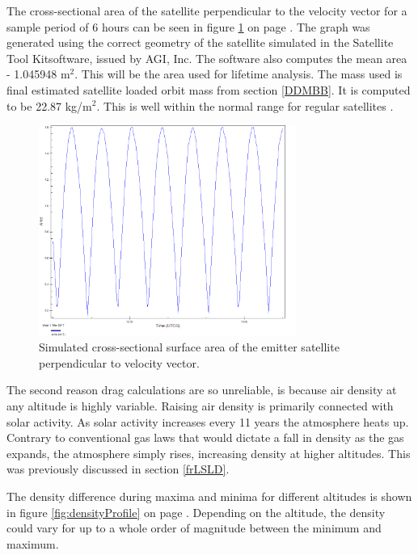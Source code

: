 The cross-sectional area of the satellite perpendicular to the velocity vector for a sample period of 6 hours can be seen in figure \ref{fig:area} on page \pageref{fig:area}. The graph was generated using the correct geometry of the satellite simulated in the Satellite Tool Kit\texttrademark software, issued by AGI, Inc. The software also computes the mean area - 1.045948 m$^2$. This will be the area used for lifetime analysis. The mass used is final estimated satellite loaded orbit mass from section \ref{DDMBB}. It is computed to be 22.87 kg/m$^2$. This is well within the normal range for regular satellites \cite{larson}.

\begin{figure}[ht!]
\centering
\includegraphics[width=0.75\textwidth, angle=0]{chapters/img/wetareaEmitter.png}
\caption{Simulated cross-sectional surface area of the emitter satellite perpendicular to velocity vector.}
\label{fig:area}
\end{figure}

The second reason drag calculations are so unreliable, is because air density at any altitude is highly variable. Raising air density is primarily connected with solar activity. As solar activity increases every 11 years the atmosphere heats up. Contrary to conventional gas laws that would dictate a fall in density as the gas expands, the atmosphere simply rises, increasing density at higher altitudes. This was previously discussed in section \ref{frLSLD}.

The density difference during maxima and minima for different altitudes is shown in figure \ref{fig:densityProfile} on page \pageref{fig:densityProfile}. Depending on the altitude, the density could vary for up to a whole order of magnitude between the minimum and maximum.

